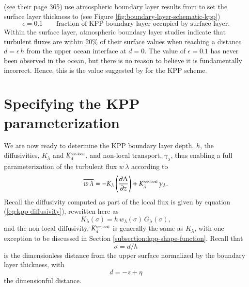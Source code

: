 \cite{LargeKPP} (see their page 365) use atmospheric boundary layer
results from \cite{Tennekes1973} to set the surface layer thickness to
(see Figure \ref{fig:boundary-layer-schematic-kpp})
\begin{equation}
 \epsilon = 0.1  \qquad \mbox{fraction of KPP boundary layer occupied by
   surface layer.}
\label{eq:epsilon-kpp}
\end{equation}
Within the surface layer, atmospheric boundary layer studies indicate
that turbulent fluxes are within 20\% of their surface values when
reaching a distance $d=\epsilon \, h$ from the upper ocean interface
at $d=0$.  The value of $\epsilon=0.1$ has never been observed in the
ocean, but there is no reason to believe it is fundamentally
incorrect. Hence, this is the value suggested by \cite{LargeKPP} for
the KPP scheme.


 
\section{Specifying the KPP parameterization}
\label{section:specifying-kpp-diffusivity-nonlocal}

We are now ready to determine the KPP boundary layer depth, $h$, the
diffusivities, $K_{\lambda}$ and $K^{\mbox{\tiny
    non-local}}_{\lambda}$, and non-local transport,
$\gamma_{\lambda}$, thus enabling a full parameterization of the
turbulent flux $\overline{w \, \lambda}$ according to
\begin{equation}
  \overline{w \, \lambda} 
  = -K_{\lambda} \left( \frac{\partial \Lambda}{\partial z} \right)
  +  K^{\mbox{\tiny  non-local}}_{\lambda} \, \gamma_{\lambda}.
\label{eq:kpp-parameterization-again}
\end{equation}
Recall the diffusivity computed as part of the local flux is given by
equation (\ref{eq:kpp-diffusivity}), rewritten here as
\begin{equation}
 K_{\lambda}(\sigma) = h \, w_{\lambda}(\sigma) \, G_{\lambda}(\sigma),
\label{eq:kpp-diffusivity-again}
\end{equation}
and the non-local diffusivity, $K^{\mbox{\tiny non-local}}_{\lambda}$
is generally the same as $K_{\lambda}$, with one exception to be
discussed in Section \ref{subsection:kpp-shape-function}.  Recall that
\begin{equation}
  \sigma = d/h
\end{equation}
is the dimensionless distance from the upper surface normalized by the
boundary layer thickness, with
\begin{equation}
 d = -z + \eta
\end{equation}
 the dimensionful distance.  


